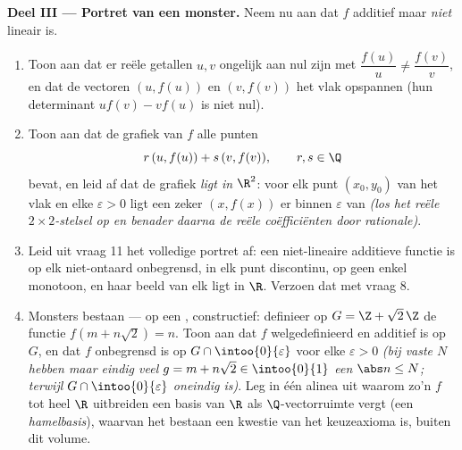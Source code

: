 \begin{problem}[{Weekendopgave --- $f(x + y) = f(x) + f(y)$: regelmaat
dwingt lineariteit af, en het portret van de monsters}]
\medskip
\noindent\textbf{Deel III --- Portret van een monster.} Neem nu aan dat
$f$ additief maar \emph{niet} lineair is.
\begin{enumerate}[resume]
  \item Toon aan dat er reële getallen $u, v$ ongelijk aan nul zijn met
        $\dfrac{f(u)}{u} \neq \dfrac{f(v)}{v}$, en dat de vectoren $(u,
        f(u))$ en $(v, f(v))$ het vlak opspannen (hun determinant $u
        f(v) - v f(u)$ is niet nul).
  \item Toon aan dat de grafiek van $f$ alle punten
        \[
        r\,(u, f(u)) + s\,(v, f(v)), \qquad r, s \in \Q
        \]
        bevat, en leid af dat de grafiek \emph{ ligt in $\R^2$}:
        voor elk punt $(x_0, y_0)$ van het vlak en elke $\varepsilon >
        0$ ligt een zeker $(x, f(x))$ er binnen $\varepsilon$ van
        \emph{(los het reële $2\times2$-stelsel op en benader daarna de
        reële coëfficiënten door rationale)}.
  \item Leid uit vraag 11 het volledige portret af: een niet-lineaire
        additieve functie is op elk niet-ontaard  onbegrensd, in
        elk punt discontinu, op geen enkel  monotoon, en haar
        beeld van elk  ligt  in $\R$. Verzoen dat met vraag
        8.
  \item Monsters bestaan --- op een  , constructief:
        definieer op $G = \Z + \sqrt2\,\Z$ de functie $f(m + n\sqrt2) =
        n$. Toon aan dat $f$ welgedefinieerd en additief is op $G$, en
        dat $f$ onbegrensd is op $G \cap \intoo{0}{\varepsilon}$ voor
        elke $\varepsilon > 0$ \emph{(bij vaste $N$ hebben maar eindig
        veel $g = m + n\sqrt2 \in \intoo{0}{1}$ een $\abs n \leq N$;
        terwijl $G \cap \intoo{0}{\varepsilon}$ oneindig is)}. Leg in
        één alinea uit waarom zo'n $f$ tot heel $\R$ uitbreiden een
        basis van $\R$ als $\Q$-vectorruimte vergt (een
        \emph{hamelbasis}), waarvan het bestaan een kwestie van het
        keuzeaxioma is, buiten dit volume.
\end{enumerate}


\end{problem}
